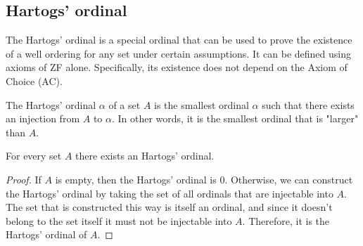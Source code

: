 \subsection{Hartogs' ordinal}
The Hartogs' ordinal is a special ordinal that can be used to prove the existence of a 
well ordering for any set under certain assumptions. It can be defined using axioms of ZF alone. 
Specifically, its existence does not depend on the Axiom of Choice (AC). \\

\begin{definition}
    The Hartogs' ordinal $\alpha$ of a set $A$ is the smallest ordinal $\alpha$ such that there 
    exists an injection from $A$ to $\alpha$. In other words, it is the smallest ordinal that is 
    "larger" than $A$.
\end{definition}

\begin{theorem}
    For every set $A$ there exists an Hartogs' ordinal.
\end{theorem}
\begin{proof}
    If $A$ is empty, then the Hartogs' ordinal is $0$. Otherwise, we can construct the Hartogs'
    ordinal by taking the set of all ordinals that are injectable into $A$. The set that is 
    constructed this way is itself an ordinal, and since it doesn't belong to the set itself 
    it must not be injectable into $A$. Therefore, it is the Hartogs' ordinal of $A$.
\end{proof}

\newpage
